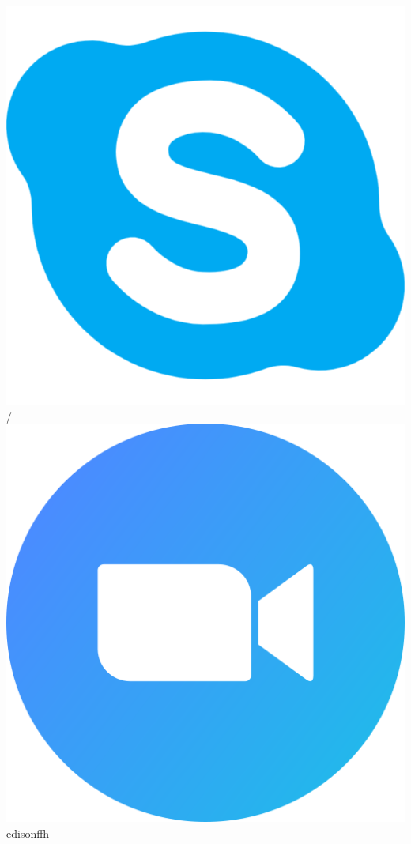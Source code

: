 \begin{center}
    \includegraphics[scale=0.023]{figs/skype_logo.png}
    /
    \includegraphics[scale=0.034]{figs/zoom.png} edisonffh
\end{center}
